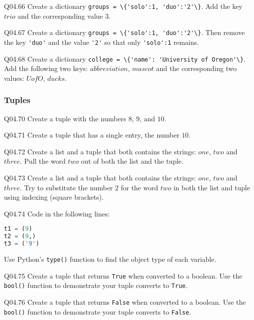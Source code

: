 \documentclass{book}
\newcommand{\passthrough}[1]{#1}
\begin{document}
Q04.66 Create a dictionary
\passthrough{\lstinline!groups = \{'solo':1, 'duo':'2'\}!}. Add the key
\(trio\) and the corresponding value \(3\).

Q04.67 Create a dictionary
\passthrough{\lstinline!groups = \{'solo':1, 'duo':'2'\}!}. Then remove
the key \passthrough{\lstinline!'duo'!} and the value
\passthrough{\lstinline!'2'!} so that only
\passthrough{\lstinline!'solo':1!} remains.

Q04.68 Create a dictionary
\passthrough{\lstinline!college = \{'name': 'University of Oregon'\}!}.
Add the following two keys: \(abbreviation\), \(mascot\) and the
corresponding two values: \(UofO\), \(ducks\).
    




    
        \hypertarget{tuples}{%
\subsubsection{Tuples}\label{tuples}}

Q04.70 Create a tuple with the numbers \(8\), \(9\), and \(10\).

Q04.71 Create a tuple that has a single entry, the number \(10\).

Q04.72 Create a list and a tuple that both contains the strings:
\(one\), \(two\) and \(three\). Pull the word \(two\) out of both the
list and the tuple.

Q04.73 Create a list and a tuple that both contains the strings:
\(one\), \(two\) and \(three\). Try to substitute the number \(2\) for
the word \(two\) in both the list and tuple using indexing (square
brackets).

Q04.74 Code in the following lines:

\begin{lstlisting}[language=Python]
t1 = (9)
t2 = (9,)
t3 = ('9')
\end{lstlisting}

Use Python's \passthrough{\lstinline!type()!} function to find the
object type of each variable.

Q04.75 Create a tuple that returns \passthrough{\lstinline!True!} when
converted to a boolean. Use the \passthrough{\lstinline!bool()!}
function to demonstrate your tuple converts to
\passthrough{\lstinline!True!}.

Q04.76 Create a tuple that returns \passthrough{\lstinline!False!} when
converted to a boolean. Use the \passthrough{\lstinline!bool()!}
function to demonstrate your tuple converts to
\passthrough{\lstinline!False!}.
    
\end{document}
